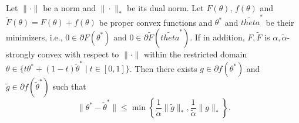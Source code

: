 \begin{proposition}\label{prop:generalnorm}
	Let $\|\cdot\|$ be a norm and $\|\cdot\|_*$ be its dual norm. Let $F(\theta)$, $f(\theta)$ and $\tilde{F}(\theta) = F(\theta) + f(\theta)$ be proper convex functions and $\theta^*$ and $\tilde{theta}^*$ be their minimizers, i.e., $0\in \partial F(\theta^*)$ and $0\in \partial \tilde{F}(\tilde{theta}^*)$.  If in addition, $F,\tilde{F}$ is $\alpha,\tilde{\alpha}$-strongly convex with respect to $\|\cdot\|$ within the restricted domain 
	$\theta \in \{  t\theta^* + (1-t)\tilde{\theta}^*  \;|\;  t\in[0,1]  \}$. 	Then there exists $g \in \partial f(\theta^*)$ and $\tilde{g}\in \partial f(\tilde{\theta}^*)$ such that
	$$
	\|\theta^*-\tilde{\theta}^*\| \leq\min\left\{\frac{1}{\alpha}\| \tilde{g}\|_*,  \frac{1}{\tilde{\alpha}}\| g\|_*\right\}.
	$$
\end{proposition}
